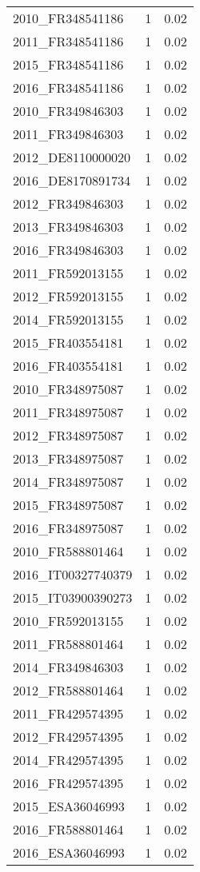\begin{table*}[htbp]
\begin{tabular}{lrr}
2010_FR348541186 & 1 & 0.02 \\
2011_FR348541186 & 1 & 0.02 \\
2015_FR348541186 & 1 & 0.02 \\
2016_FR348541186 & 1 & 0.02 \\
2010_FR349846303 & 1 & 0.02 \\
2011_FR349846303 & 1 & 0.02 \\
2012_DE8110000020 & 1 & 0.02 \\
2016_DE8170891734 & 1 & 0.02 \\
2012_FR349846303 & 1 & 0.02 \\
2013_FR349846303 & 1 & 0.02 \\
2016_FR349846303 & 1 & 0.02 \\
2011_FR592013155 & 1 & 0.02 \\
2012_FR592013155 & 1 & 0.02 \\
2014_FR592013155 & 1 & 0.02 \\
2015_FR403554181 & 1 & 0.02 \\
2016_FR403554181 & 1 & 0.02 \\
2010_FR348975087 & 1 & 0.02 \\
2011_FR348975087 & 1 & 0.02 \\
2012_FR348975087 & 1 & 0.02 \\
2013_FR348975087 & 1 & 0.02 \\
2014_FR348975087 & 1 & 0.02 \\
2015_FR348975087 & 1 & 0.02 \\
2016_FR348975087 & 1 & 0.02 \\
2010_FR588801464 & 1 & 0.02 \\
2016_IT00327740379 & 1 & 0.02 \\
2015_IT03900390273 & 1 & 0.02 \\
2010_FR592013155 & 1 & 0.02 \\
2011_FR588801464 & 1 & 0.02 \\
2014_FR349846303 & 1 & 0.02 \\
2012_FR588801464 & 1 & 0.02 \\
2011_FR429574395 & 1 & 0.02 \\
2012_FR429574395 & 1 & 0.02 \\
2014_FR429574395 & 1 & 0.02 \\
2016_FR429574395 & 1 & 0.02 \\
2015_ESA36046993 & 1 & 0.02 \\
2016_FR588801464 & 1 & 0.02 \\
2016_ESA36046993 & 1 & 0.02 \\

\end{tabular}
\end{table*}
